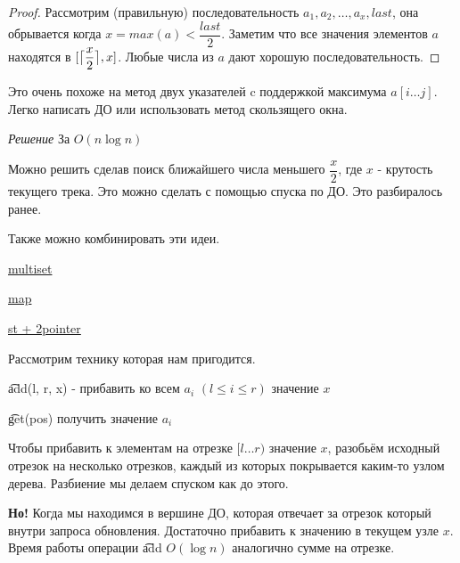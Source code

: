 \begin{proof}
	Рассмотрим (правильную) последовательность $a_1, a_2, \ldots, a_x, last$, она обрывается когда $x=max(a) < \dfrac{last}{2}$. Заметим что все значения элементов $a$ находятся в $[\ceil[\big]{\dfrac{x}{2}}, x]$. Любые числа из $a$ дают хорошую последовательность.
\end{proof} \up
Это очень похоже на метод двух указателей c поддержкой максимума $a[i \ldots j]$. Легко написать ДО или использовать метод скользящего окна.

\down

{\it Решение } За $O(n \log n)$
\href{https://codeforces.com/contest/1237/submission/62700019}{}

Можно решить сделав поиск ближайшего числа меньшего $\dfrac{x}{2}$, где $x$ - крутость текущего трека. Это можно сделать с помощью спуска по ДО. Это разбиралось ранее. 

Также можно комбинировать эти идеи.

\href{https://codeforces.com/contest/1237/submission/62700598}{multiset }

\href{https://codeforces.com/contest/1237/submission/62695687}{map }

\href{https://codeforces.com/contest/1237/submission/62712896}{st + 2pointer }

\pagebreak


Рассмотрим технику которая нам пригодится.

\begin{MyList}[0pt]
	\item \t{add(l, r, x)} - прибавить ко всем $a_i$ $(l \le i \le r)$ значение $x$
	\item \t{get(pos)} получить значение $a_i$
\end{MyList}
\up \up


Чтобы прибавить к элементам на отрезке $[l \ldots r)$ значение $x$, разобьём исходный отрезок на несколько отрезков, каждый из которых покрывается каким-то узлом дерева. Разбиение мы делаем спуском как до этого.

{\bf Но!} Когда мы находимся в вершине ДО, которая отвечает за отрезок который внутри запроса обновления. Достаточно прибавить к значению в текущем узле $x$. Время работы операции \t{add} $O(\log n)$ аналогично сумме на отрезке.
\down

